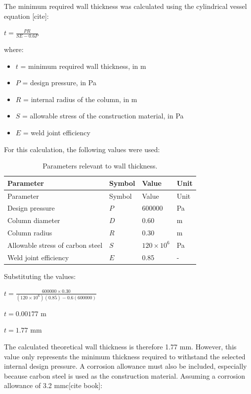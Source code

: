 The minimum required wall thickness was calculated using the cylindrical
vessel equation {[}cite{]}:

\(t = \frac{P R}{S E - 0.6P}\)

where:

\begin{itemize}
\tightlist
\item
  \(t\) = minimum required wall thickness, in m
\item
  \(P\) = design pressure, in Pa
\item
  \(R\) = internal radius of the column, in m
\item
  \(S\) = allowable stress of the construction material, in Pa
\item
  \(E\) = weld joint efficiency
\end{itemize}

For this calculation, the following values were used:

\begin{longtable}[]{@{}llll@{}}
\caption{Parameters relevant to wall thickness.
\label{tab:wall thickness}}\tabularnewline
\toprule\noalign{}
Parameter & Symbol & Value & Unit \\
\midrule\noalign{}
\endfirsthead
\toprule\noalign{}
Parameter & Symbol & Value & Unit \\
\midrule\noalign{}
\endhead
\bottomrule\noalign{}
\endlastfoot
Design pressure & \(P\) & 600000 & Pa \\
Column diameter & \(D\) & 0.60 & m \\
Column radius & \(R\) & 0.30 & m \\
Allowable stress of carbon steel & \(S\) & \(120 \times 10^6\) & Pa \\
Weld joint efficiency & \(E\) & 0.85 & - \\
\end{longtable}

Substituting the values:

\(t = \frac{600000 \times 0.30}{(120 \times 10^6)(0.85) - 0.6(600000)}\)

\(t = 0.00177 \text{ m}\)

\(t = 1.77 \text{ mm}\)

The calculated theoretical wall thickness is therefore 1.77 mm. However,
this value only represents the minimum thickness required to withstand
the selected internal design pressure. A corrosion allowance must also
be included, especially because carbon steel is used as the construction
material. Assuming a corrosion allowance of 3.2 mmc{[}cite book{]}:


